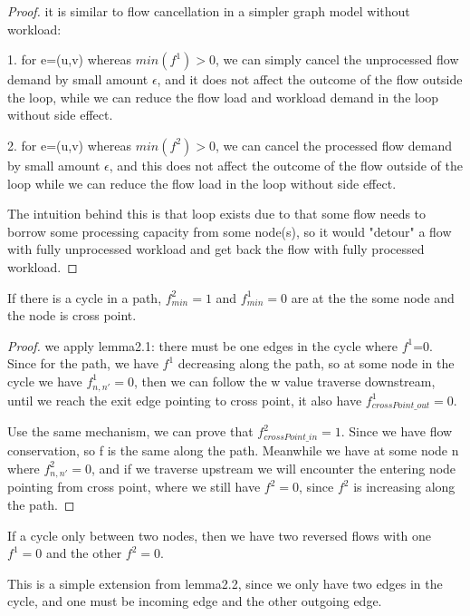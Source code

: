 \documentclass[twoside,leqno, 11pt]{article}
\begin{document}
\begin{proof} it is similar to flow cancellation in a simpler graph model without workload: 

1. for e=(u,v) whereas $min(f^1) >0$, we can simply cancel the unprocessed flow demand by small amount $\epsilon$, and it does not affect the outcome of the flow outside the loop, while we can reduce the flow load and workload demand in the loop without side effect. 

2. for e=(u,v) whereas $min(f^2)>0$, we can cancel the processed flow demand by small amount $\epsilon$, and this does not affect the outcome of the flow outside of the loop while we can reduce the flow load in the loop without side effect. 


The intuition behind this is that loop exists due to that some flow needs to borrow some processing capacity from some node(s), so it would "detour" a flow with fully unprocessed workload and get back the flow with fully processed workload. 
\end{proof}

\begin{lemma} If there is a cycle in a path, $f^2_{min}= 1$ and $f^1_{min} = 0$ are at the the some node and the node is cross point. 
\end{lemma}
\begin{proof}
we apply lemma2.1: there must be one edges in the cycle where $f^1$=0. Since for the path, we have $f^1$ decreasing along the path, so at some node in the cycle we have $f^1_{n, n'}=0$, then we can follow the w value traverse downstream, until we reach the exit edge pointing to cross point, it also have  $f^1_{crossPoint\_out}=0$. 

Use the same mechanism, we can prove that $f^2_{crossPoint\_in}=1$. Since we have flow conservation, so f is the same along the path. Meanwhile we have at some node n where $f^2_{n,n'}=0$, and if we traverse upstream we will encounter the entering node pointing from cross point, where we still have $f^2=0$, since $f^2$ is increasing along the path.
\end{proof}

\begin{lemma} If a cycle only between two nodes, then we have two reversed flows with one $f^1=0$ and the other $f^2=0$.
\end{lemma}
This is a simple extension from lemma2.2, since we only have two edges in the cycle, and one must be incoming edge and the other outgoing edge. 
\end{document}

